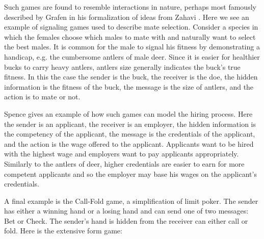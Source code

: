 \documentclass{article}
\begin{document}
Such games are found to resemble interactions in nature, perhaps most famously described by Grafen \cite{grafen1} in his formalization of ideas from Zahavi \cite{zahavi1}. Here we see an example of signaling games used to describe mate selection. Consider a species in which the females choose which males to mate with and naturally want to select the best males. It is common for the male to signal his fitness by demonstrating a handicap, e.g. the cumbersome antlers of male deer. Since it is easier for healthier bucks to carry heavy antlers, antlers size generally indicates the buck's true fitness. In this the case the sender is the buck, the receiver is the doe, the hidden information is the fitness of the buck, the message is the size of antlers, and the action is to mate or not. 

Spence \cite{spence1} gives an example of how such games can model the hiring process. Here the sender is an applicant, the receiver is an employer, the hidden information is the competency of the applicant, the message is the credentials of the applicant, and the action is the wage offered to the applicant. Applicants want to be hired with the highest wage and employers want to pay applicants appropriately. Similarly to the antlers of deer, higher credentials are easier to earn for more competent applicants and so the employer may base his wages on the applicant's credentials.

A final example is the Call-Fold game, a simplification of limit poker. The sender has either a winning hand or a losing hand and can send one of two messages: Bet or Check. The sender's hand is hidden from the receiver can either call or fold. Here is the extensive form game:
\end{document}
